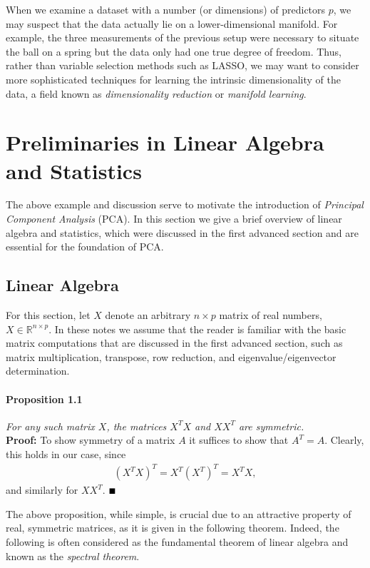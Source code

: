 \documentclass[12pt,letterpaper]{article}
\newcommand{\Rset}{\mathbb{R}}
\begin{document}
When we examine a dataset with a number (or dimensions) of predictors $p$, we may suspect that the data actually lie on a lower-dimensional manifold. For example, the three measurements of the previous setup were necessary to situate the ball on a spring but the data only had one true degree of freedom. Thus, rather than variable selection methods such as LASSO, we may want to consider more sophisticated techniques for learning the intrinsic dimensionality of the data, a field known as \emph{dimensionality reduction} or \emph{manifold learning}.

\section{Preliminaries in Linear Algebra and Statistics}

The above example and discussion  serve to motivate the introduction of \emph{Principal Component Analysis} (PCA).  In this section we give a brief overview of linear algebra and statistics, which were discussed in the first advanced section and are essential for the foundation of PCA.

\subsection{Linear Algebra}
For this section, let $X$ denote an arbitrary $n\times p$ matrix of real numbers, $X \in  {\Rset}^{n\times p}$. In these notes we assume that the reader is familiar with the basic matrix computations that are discussed in the first advanced section, such as matrix multiplication, transpose, row reduction, and
eigenvalue/eigenvector determination. 

\noindent
\paragraph*{\bf Proposition 1.1} \label{par:prop1.1} \textit{For any such matrix $X$, the matrices $X^T X$ and $X X^T$ are symmetric.}
\\
{\bf Proof:} To show symmetry of a matrix $A$ it suffices to show that $A^T = A$. Clearly, this holds in our case, since
\begin{align}
{(X^T X)}^T = X^T (X^T )^T = X^T X,
\end{align}
and similarly for $XX^T$. $\hfill \blacksquare$

The above proposition, while simple, is crucial due to an attractive property of real, symmetric matrices,  as it is given in the following theorem. Indeed, the following is often considered  as the fundamental theorem of linear algebra and  known as the \emph{spectral theorem}.
\end{document}
